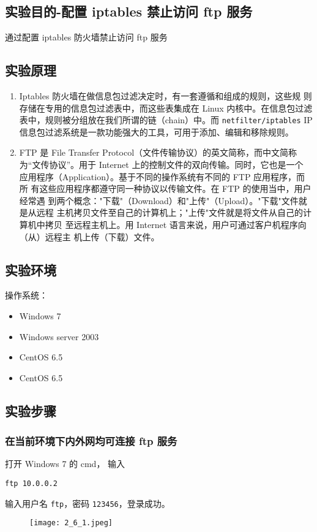\subsection{实验目的-配置 iptables 禁止访问 ftp 服务}
通过配置 iptables 防火墙禁止访问 ftp 服务
%
\subsection{实验原理}
\begin{enumerate}
  \item Iptables 防火墙在做信息包过滤决定时，有一套遵循和组成的规则，这些规
    则存储在专用的信息包过滤表中，而这些表集成在 Linux 内核中。在信息包过滤
    表中，规则被分组放在我们所谓的链（chain）中。而 \texttt{netfilter/iptables} IP
    信息包过滤系统是一款功能强大的工具，可用于添加、编辑和移除规则。
  \item FTP 是 File Transfer Protocol（文件传输协议）的英文简称，而中文简称
    为“文传协议”。用于 Internet 上的控制文件的双向传输。同时，它也是一个
    应用程序（Application）。基于不同的操作系统有不同的 FTP 应用程序，而所
    有这些应用程序都遵守同一种协议以传输文件。在 FTP 的使用当中，用户经常遇
    到两个概念："下载"（Download）和"上传"（Upload）。"下载"文件就是从远程
    主机拷贝文件至自己的计算机上；"上传"文件就是将文件从自己的计算机中拷贝
    至远程主机上。用 Internet 语言来说，用户可通过客户机程序向（从）远程主
    机上传（下载）文件。
\end{enumerate}
%
\subsection{实验环境}
操作系统：
\begin{itemize}
  \item Windows 7
  \item Windows server 2003
  \item CentOS 6.5
  \item CentOS 6.5
\end{itemize}
%
\subsection{实验步骤}
\subsubsection{在当前环境下内外网均可连接 ftp 服务}
打开 Windows 7 的 cmd，
输入
\begin{verbatim}
ftp 10.0.0.2
\end{verbatim}
输入用户名 \texttt{ftp}，密码 \texttt{123456}，登录成功。
\begin{figure}[H]
  \begin{center}
    \texttt{[image: 2\_6\_1.jpeg]}
  \end{center}
\end{figure}

